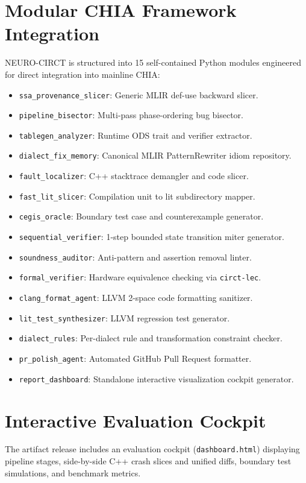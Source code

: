 \documentclass[conference]{IEEEtran}
\begin{document}
\section{Modular CHIA Framework Integration}
NEURO-CIRCT is structured into 15 self-contained Python modules engineered for direct integration into mainline CHIA:
\begin{itemize}
    \item \texttt{ssa\_provenance\_slicer}: Generic MLIR def-use backward slicer.
    \item \texttt{pipeline\_bisector}: Multi-pass phase-ordering bug bisector.
    \item \texttt{tablegen\_analyzer}: Runtime ODS trait and verifier extractor.
    \item \texttt{dialect\_fix\_memory}: Canonical MLIR PatternRewriter idiom repository.
    \item \texttt{fault\_localizer}: C++ stacktrace demangler and code slicer.
    \item \texttt{fast\_lit\_slicer}: Compilation unit to lit subdirectory mapper.
    \item \texttt{cegis\_oracle}: Boundary test case and counterexample generator.
    \item \texttt{sequential\_verifier}: 1-step bounded state transition miter generator.
    \item \texttt{soundness\_auditor}: Anti-pattern and assertion removal linter.
    \item \texttt{formal\_verifier}: Hardware equivalence checking via \texttt{circt-lec}.
    \item \texttt{clang\_format\_agent}: LLVM 2-space code formatting sanitizer.
    \item \texttt{lit\_test\_synthesizer}: LLVM regression test generator.
    \item \texttt{dialect\_rules}: Per-dialect rule and transformation constraint checker.
    \item \texttt{pr\_polish\_agent}: Automated GitHub Pull Request formatter.
    \item \texttt{report\_dashboard}: Standalone interactive visualization cockpit generator.
\end{itemize}

\section{Interactive Evaluation Cockpit}
The artifact release includes an evaluation cockpit (\texttt{dashboard.html}) displaying pipeline stages, side-by-side C++ crash slices and unified diffs, boundary test simulations, and benchmark metrics.
\end{document}
